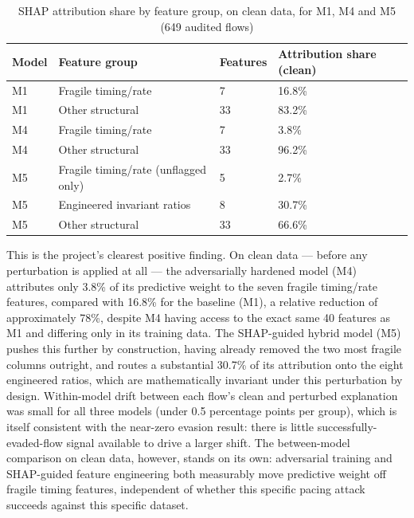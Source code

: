 \documentclass[12pt,a4paper]{report}
\begin{document}
\begin{table}[h]\centering
\caption{SHAP attribution share by feature group, on clean data, for M1, M4 and M5 (649 audited flows)}
\begin{tabularx}{\linewidth}{XXXX}
\toprule
\textbf{Model} & \textbf{Feature group} & \textbf{Features} & \textbf{Attribution share (clean)} \\
\midrule
M1 & Fragile timing/rate & 7 & 16.8\% \\
M1 & Other structural & 33 & 83.2\% \\
M4 & Fragile timing/rate & 7 & 3.8\% \\
M4 & Other structural & 33 & 96.2\% \\
M5 & Fragile timing/rate (unflagged only) & 5 & 2.7\% \\
M5 & Engineered invariant ratios & 8 & 30.7\% \\
M5 & Other structural & 33 & 66.6\% \\
\bottomrule
\end{tabularx}
\end{table}
This is the project's clearest positive finding. On clean data --- before any perturbation is applied at all --- the adversarially hardened model (M4) attributes only 3.8\% of its predictive weight to the seven fragile timing/rate features, compared with 16.8\% for the baseline (M1), a relative reduction of approximately 78\%, despite M4 having access to the exact same 40 features as M1 and differing only in its training data. The SHAP-guided hybrid model (M5) pushes this further by construction, having already removed the two most fragile columns outright, and routes a substantial 30.7\% of its attribution onto the eight engineered ratios, which are mathematically invariant under this perturbation by design. Within-model drift between each flow's clean and perturbed explanation was small for all three models (under 0.5 percentage points per group), which is itself consistent with the near-zero evasion result: there is little successfully-evaded-flow signal available to drive a larger shift. The between-model comparison on clean data, however, stands on its own: adversarial training and SHAP-guided feature engineering both measurably move predictive weight off fragile timing features, independent of whether this specific pacing attack succeeds against this specific dataset.
\end{document}
